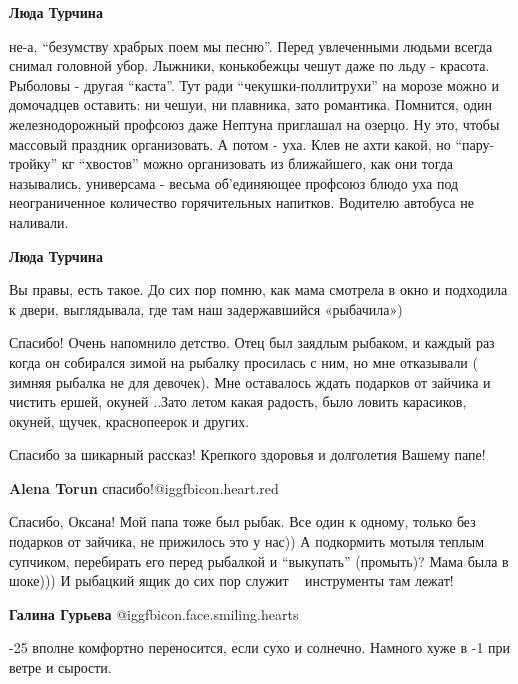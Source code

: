 \begin{itemize}
\begin{itemize} %
\textbf{Люда Турчина} 

не-а, \enquote{безумству храбрых поем мы песню}. Перед увлеченными людьми всегда снимал
головной убор. Лыжники, конькобежцы чешут даже по льду - красота. Рыболовы -
другая \enquote{каста}. Тут ради \enquote{чекушки-поллитрухи} на морозе можно и домочадцев
оставить: ни чешуи, ни плавника, зато романтика. Помнится, один железнодорожный
профсоюз даже Нептуна приглашал на озерцо. Ну это, чтобы массовый праздник
организовать. А потом - уха. Клев не ахти какой, но \enquote{пару-тройку} кг \enquote{хвостов}
можно организовать из ближайшего, как они тогда назывались, универсама - весьма
об'единяющее профсоюз блюдо уха под неограниченное количество горячительных
напитков. Водителю автобуса не наливали.

\textbf{Люда Турчина} 

Вы правы, есть такое. До сих пор помню, как мама смотрела в окно и подходила к
двери, выглядывала, где там наш задержавшийся «рыбачила»)

\end{itemize} %


Спасибо! Очень напомнило детство. Отец был заядлым рыбаком, и каждый раз когда
он собирался зимой на рыбалку просилась с ним, но мне отказывали ( зимняя
рыбалка не для девочек). Мне оставалось ждать подарков от зайчика и чистить
ершей, окуней ..Зато летом какая радость, было ловить карасиков, окуней, щучек,
краснопеерок и других.


Спасибо за шикарный рассказ! Крепкого здоровья и долголетия Вашему папе!

\textbf{Alena Torun} спасибо!@igg{fbicon.heart.red}


Спасибо, Оксана! Мой папа тоже был рыбак. Все один к одному, только без
подарков от зайчика, не прижилось это у нас)) А подкормить мотыля теплым
супчиком, перебирать его перед рыбалкой и \enquote{выкупать} (промыть)? Мама
была в шоке))) И рыбацкий ящик до сих пор служит ~ инструменты там лежат!


\textbf{Галина Гурьева}  @igg{fbicon.face.smiling.hearts} 


-25 вполне комфортно переносится, если сухо и солнечно. Намного хуже в -1 при
ветре и сырости.


\end{itemize}
